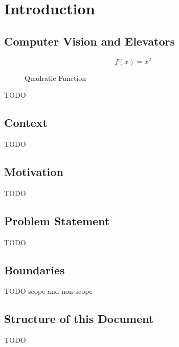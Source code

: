 \chapter{Introduction}
\label{chap:intro}

\section{Computer Vision and Elevators}

\begin{figure}
\begin{equation}
f(x)=x^2
\label{eqn:e2}
\end{equation}
\caption{Quadratic Function}
\end{figure}

\lipsum[1-10]

TODO

\section{Context}

TODO

\section{Motivation}

TODO

\section{Problem Statement}

TODO

\section{Boundaries}

TODO scope and non-scope

\section{Structure of this Document}

TODO